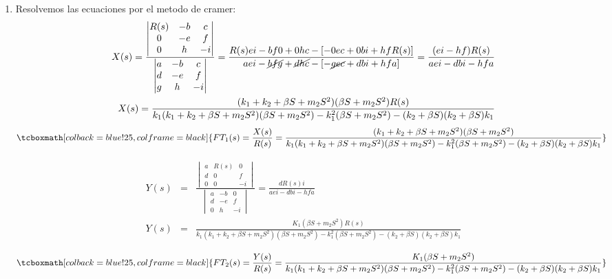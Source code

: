 \documentclass[12pt]{article}
\begin{document}
\begin{enumerate}
  \item Resolvemos las ecuaciones por el metodo de cramer:
    \begin{eqnarray*}
      X(s)=\frac{
      \begin{vmatrix}
        R(s) & -b & c\\
        0 & -e & f\\
        0 & h & -i
      \end{vmatrix}}
      {\begin{vmatrix}
        a & -b & c\\
        d & -e & f\\
        g & h & -i
      \end{vmatrix}}
      =\frac{R(s)ei-bf0+0hc-[-0ec+0bi+hfR(s)]}{aei-\cancel{bfg}+\cancel{dhc}-[-\cancel{gec}+dbi+hfa]}=\frac{(ei-hf)R(s)}{aei-dbi-hfa}\\
      X(s)=\frac{(k_{1}+k_{2}+\beta S+m_{2}S^{2})(\beta S+m_{2}S^{2})R(s)}{k_{1}(k_{1}+k_{2}+\beta S +m_{2}S^{2})(\beta S +m_{2}S^{2})-k_{1}^{2}(\beta S + m_{2}S^{2})-(k_{2}+\beta S)(k_{2}+\beta S)k_{1}}
    \end{eqnarray*}
    \begin{eqnarray*}
      \tcboxmath[colback=blue!25,colframe=black]
      {FT_{1}(s)=\frac{X(s)}{R(s)}=\frac{(k_{1}+k_{2}+\beta S+m_{2}S^{2})(\beta S+m_{2}S^{2})}{k_{1}(k_{1}+k_{2}+\beta S +m_{2}S^{2})(\beta S +m_{2}S^{2})-k_{1}^{2}(\beta S + m_{2}S^{2})-(k_{2}+\beta S)(k_{2}+\beta S)k_{1}}}
    \end{eqnarray*}

    \begin{eqnarray*}
      Y(s)&=&\frac{
      \begin{vmatrix}
        a & R(s) & 0\\
        d & 0 & f\\
        0 & 0 & -i
      \end{vmatrix}}
      {\begin{vmatrix}
        a & -b & 0\\
        d & -e & f\\
        0 & h & -i
      \end{vmatrix}}
      =\frac{dR(s)i}{aei-dbi-hfa}\\
      Y(s)&=&\frac{K_{1}(\beta S + m_{2}S^{2})R(s)}{k_{1}(k_{1}+k_{2}+\beta S +m_{2}S^{2})(\beta S +m_{2}S^{2})-k_{1}^{2}(\beta S + m_{2}S^{2})-(k_{2}+\beta S)(k_{2}+\beta S)k_{1}}\\
    \end{eqnarray*}
    \begin{eqnarray*}
      \tcboxmath[colback=blue!25,colframe=black]
      {FT_{2}(s)=\frac{Y(s)}{R(s)}=
      \frac{K_{1}(\beta S + m_{2}S^{2})}{k_{1}(k_{1}+k_{2}+\beta S +m_{2}S^{2})(\beta S +m_{2}S^{2})-k_{1}^{2}(\beta S + m_{2}S^{2})-(k_{2}+\beta S)(k_{2}+\beta S)k_{1}}}\\
    \end{eqnarray*}

\end{enumerate}
\end{document}
